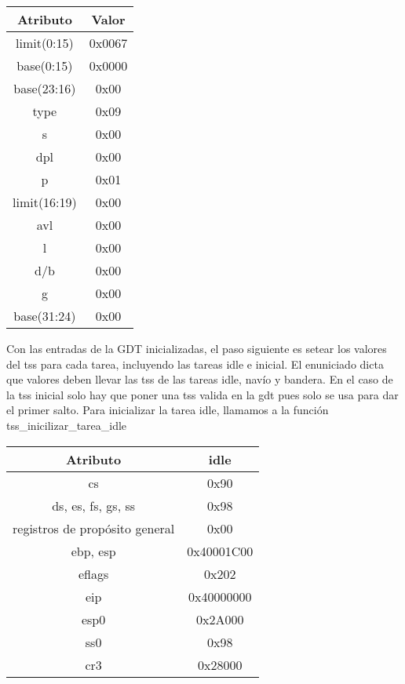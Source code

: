 \documentclass[10pt, a4paper]{article}
\begin{document}
\begin{center}
\begin{tabular}{| c || c |}
	\hline
		Atributo & Valor\\
	\hline
		limit(0:15) & 0x0067\\
		base(0:15) & 0x0000 \\
		base(23:16) & 0x00 \\
		type & 0x09 \\
		s & 0x00 \\
		dpl & 0x00\\
		p & 0x01 \\
		limit(16:19) & 0x00\\
		avl & 0x00\\
		l & 0x00\\
		d/b & 0x00\\
		g & 0x00\\
		base(31:24) & 0x00\\
	\hline

\end{tabular}
\end{center}

Con las entradas de la GDT inicializadas, el paso siguiente es setear los valores del tss para cada tarea, incluyendo las tareas idle e inicial.
El enuniciado dicta que valores deben llevar las tss de las tareas idle, nav\'io y bandera. En el caso de la tss inicial solo hay que poner una tss valida
en la gdt pues solo se usa para dar el primer salto. Para inicializar la tarea idle, llamamos a la funci\'on tss\_inicilizar\_tarea\_idle

\begin{center}
\begin{tabular}{| c || c |}

	\hline
		Atributo & idle \\
	\hline
		cs & 0x90 \\
		ds, es, fs, gs, ss & 0x98 \\
		registros de prop\'osito general & 0x00 \\
		ebp, esp & 0x40001C00 \\
		eflags & 0x202 \\
		eip & 0x40000000 \\
		esp0 & 0x2A000 \\
		ss0 & 0x98 \\
		cr3 & 0x28000 \\
	\hline

\end{tabular}
\end{center}
\end{document}
